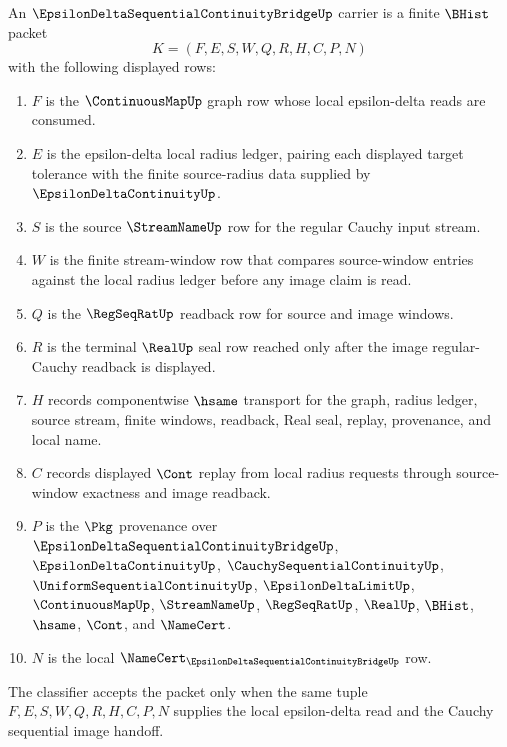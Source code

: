 \begin{definition}
\label{def:epsilon-delta-sequential-continuity-bridge-carrier}
An $\EpsilonDeltaSequentialContinuityBridgeUp$ carrier is a finite $\BHist$ packet
$$
K=(F,E,S,W,Q,R,H,C,P,N)
$$
with the following displayed rows:
\begin{enumerate}
\item $F$ is the $\ContinuousMapUp$ graph row whose local epsilon-delta reads are consumed.
\item $E$ is the epsilon-delta local radius ledger, pairing each displayed target tolerance with the finite source-radius data supplied by $\EpsilonDeltaContinuityUp$.
\item $S$ is the source $\StreamNameUp$ row for the regular Cauchy input stream.
\item $W$ is the finite stream-window row that compares source-window entries against the local radius ledger before any image claim is read.
\item $Q$ is the $\RegSeqRatUp$ readback row for source and image windows.
\item $R$ is the terminal $\RealUp$ seal row reached only after the image regular-Cauchy readback is displayed.
\item $H$ records componentwise $\hsame$ transport for the graph, radius ledger, source stream, finite windows, readback, Real seal, replay, provenance, and local name.
\item $C$ records displayed $\Cont$ replay from local radius requests through source-window exactness and image readback.
\item $P$ is the $\Pkg$ provenance over $\EpsilonDeltaSequentialContinuityBridgeUp$, $\EpsilonDeltaContinuityUp$, $\CauchySequentialContinuityUp$, $\UniformSequentialContinuityUp$, $\EpsilonDeltaLimitUp$, $\ContinuousMapUp$, $\StreamNameUp$, $\RegSeqRatUp$, $\RealUp$, $\BHist$, $\hsame$, $\Cont$, and $\NameCert$.
\item $N$ is the local $\NameCert_{\EpsilonDeltaSequentialContinuityBridgeUp}$ row.
\end{enumerate}
The classifier accepts the packet only when the same tuple $F,E,S,W,Q,R,H,C,P,N$ supplies the local epsilon-delta read and the Cauchy sequential image handoff.
\end{definition}

